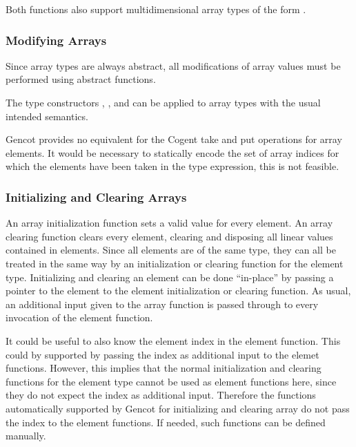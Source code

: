 Both functions also support multidimensional array types of the form .

\subsubsection{Modifying Arrays}

Since array types are always abstract, all modifications of array values must be performed using abstract functions.

The type constructors , , and  can be applied to array types with the 
usual intended semantics. 

Gencot provides no equivalent for the Cogent take and put operations for array elements. It would be
necessary to statically encode the set of array indices for which the elements have been taken in the type expression,
this is not feasible.

\subsubsection{Initializing and Clearing Arrays}

An array initialization function sets a valid value for every element. An array clearing function clears every element, 
clearing and disposing all linear values contained in elements. Since all elements are of the same type, they can all be
treated in the same way by an initialization or clearing function for the element type. Initializing and clearing an element
can be done ``in-place'' by passing a pointer to the element to the element initialization or clearing function. As usual,
an additional input given to the array function is passed through to every invocation of the element function. 

It could be useful to also know the element index in the element function. This could by supported by passing the index
as additional input to the elemet functions. However, this implies that the normal initialization and clearing functions
for the element type cannot be used as element functions here, since they do not expect the index as additional input.
Therefore the functions automatically supported by Gencot for initializing and clearing array do not pass the index 
to the element functions. If needed, such functions can be defined manually.

